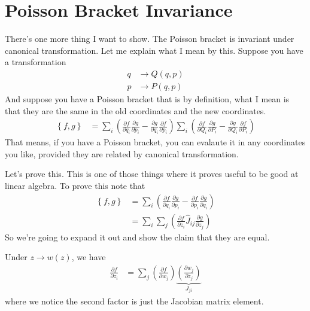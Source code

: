 \section{Poisson Bracket Invariance}
There's one more thing I want to show.
The Poisson bracket is invariant under canonical transformation.
Let me explain what I mean by this.
Suppose you have a transformation
\begin{align}
    q &\to Q(q, p)\\
    p &\to P(q, p)
\end{align}
And suppose you have a Poisson bracket that is by definition,
what I mean is that they are the same in the old coordinates and the new
coordinates.
\begin{align}
    \left\{ f, g \right\}
    &=
    \sum_{i}
    \left( 
    \frac{\partial f}{\partial q_i}
    \frac{\partial g}{\partial p_i}
    -
    \frac{\partial g}{\partial q_i}
    \frac{\partial f}{\partial p_i}
    \right)
    \sum_{i}
    \left( 
    \frac{\partial f}{\partial Q_i}
    \frac{\partial g}{\partial P_i}
    -
    \frac{\partial g}{\partial Q_i}
    \frac{\partial f}{\partial P_i}
    \right)
\end{align}
That means,
if you have a Poisson bracket,
you can evalaute it in any coordinates you like,
provided they are related by canonical transformation.

Let's prove this.
This is one of those things where it proves useful to be good at linear algebra.
To prove this note that
\begin{align}
    \left\{ f, g \right\}
    &=
    \sum_i
    \left( 
    \frac{\partial f}{\partial q_i}
    \frac{\partial g}{\partial p_i}
    -
    \frac{\partial f}{\partial p_i}
    \frac{\partial g}{\partial q_i}
    \right)\\
    &=
    \sum_{i}
    \sum_{j}
    \left( 
    \frac{\partial f}{\partial z_i}
    \hat{J}_{ij}
    \frac{\partial g}{\partial z_j}
    \right)
\end{align}
So we're going to expand it out and show the claim that they are equal.

Under $z\to w(z)$,
we have
\begin{align}
    \frac{\partial f}{\partial z_i}
    &=
    \sum_{j}
    \left( \frac{\partial f}{\partial w_j} \right)
    \underbrace{\left( \frac{\partial w_j}{\partial z_j} \right)}_{J_{ji}}
\end{align}
where we notice the second factor is just the Jacobian matrix element.


